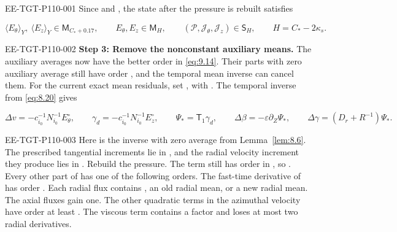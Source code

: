 %
\begin{EESegment}{EE-TGT-P110-001}
Since  and
, the state after the pressure is rebuilt satisfies
\end{EESegment}
\begin{equation}
\langle E_\theta\rangle_Y,\ \langle E_z\rangle_Y\in \mathsf M_{C_*+0.17},
\qquad E_\theta,E_z\in \mathsf M_H,
\qquad (\mathcal P,\mathcal J_\theta,\mathcal J_z)\in \mathsf S_H,
\qquad H=C_*-2\kappa_s.
\tag{9.14}\label{eq:9.14}
\end{equation}

\begin{EESegment}{EE-TGT-P110-002}
\noindent\textbf{Step 3: Remove the nonconstant auxiliary means.} The auxiliary averages now have
the better order in \eqref{eq:9.14}. Their parts with zero auxiliary average still have order
, and the temporal mean inverse can cancel them. For the current exact
mean residuals, set
, with
. The temporal inverse from \eqref{eq:8.20} gives
\end{EESegment}
\[
\Delta v=-c_{i_0}^{-1}N_{i_0}^{-1}E_\theta^\circ,
\qquad
\gamma_d=-c_{i_0}^{-1}N_{i_0}^{-1}E_z^\circ,
\qquad
\Psi_*=\mathsf T_1\gamma_d,
\qquad
\Delta\beta=-\varepsilon\partial_Z\Psi_*,
\qquad
\Delta\gamma=(D_r+R^{-1})\Psi_*.
\]
\begin{EESegment}{EE-TGT-P110-003}
Here  is the inverse with zero average from
Lemma~\ref{lem:8.6}. The prescribed tangential increments lie in
, and the radial velocity increment they produce lies in
. Rebuild the pressure. The term
 still has order  in
, so . Every
other part of  has one of the following orders. The fast-time
derivative of  has order
. Each radial flux contains , an old radial
mean, or a new radial mean. The axial fluxes gain one. The other quadratic terms in the azimuthal
velocity have order at least . The viscous term contains a factor
 and loses at most two radial derivatives.
\end{EESegment}

